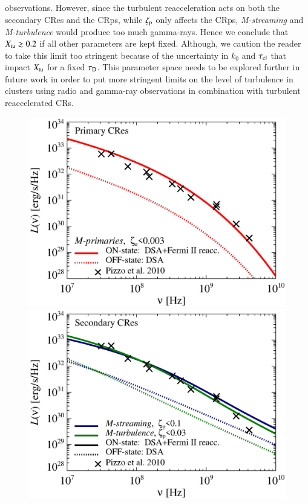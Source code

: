 \documentclass[fleqn,usenatbib,useAMS]{mnras}
\newcommand{\Mstream}{{\it M-streaming}\xspace}
\newcommand{\Mflatturb}{{\it M-turbulence}\xspace}
\begin{document}
observations. However, since the turbulent reacceleration acts on both
the secondary CRes and the CRps, while $\zeta_{\mathrm{p}}$ only affects
the CRps, \Mstream and \Mflatturb would produce too much
gamma-rays. Hence we conclude that $X_{\mathrm{tu}}\gtrsim0.2$ if all other
parameters are kept fixed. Although, we caution the reader to take
this limit too stringent because of the uncertainty in $k_0$ and
$\tau_{\mathrm{cl}}$ that impact $X_{\mathrm{tu}}$ for a fixed
$\tau_{\mathrm{D}}$. This parameter space needs to be explored further in
future work in order to put more stringent limits on the level of
turbulence in clusters using radio and gamma-ray observations in
combination with turbulent reaccelerated CRs.

\begin{figure}
  \includegraphics[width=1.0\columnwidth]{sync.spec.pri.g72a.140.v6.eps}
  \includegraphics[width=1.0\columnwidth]{sync.spec.sec.g72a.140.v6.eps}

\end{figure}
\end{document}
